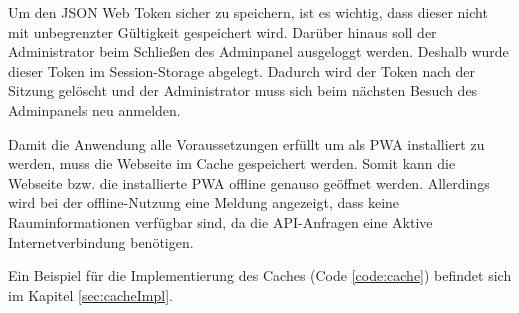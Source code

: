 
Um den JSON Web Token sicher zu speichern, ist es wichtig, dass dieser nicht mit unbegrenzter Gültigkeit gespeichert wird. Darüber hinaus soll der Administrator beim Schließen des Adminpanel ausgeloggt werden. Deshalb wurde dieser Token im Session-Storage abgelegt. Dadurch wird der Token nach der Sitzung gelöscht und der Administrator muss sich beim nächsten Besuch des Adminpanels neu anmelden.


Damit die Anwendung alle Voraussetzungen erfüllt um als PWA installiert zu werden, muss die Webseite im Cache gespeichert werden. Somit kann die Webseite bzw. die installierte PWA offline genauso geöffnet werden. Allerdings wird bei der offline-Nutzung eine Meldung angezeigt, dass keine Rauminformationen verfügbar sind, da die API-Anfragen eine Aktive Internetverbindung benötigen.

Ein Beispiel für die Implementierung des Caches (Code \ref{code:cache}) befindet sich im Kapitel \ref{sec:cacheImpl}.
 